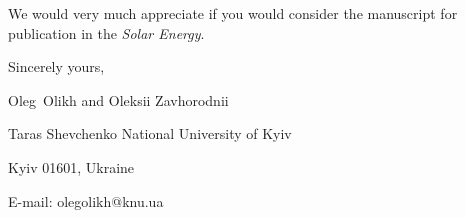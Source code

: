 \documentclass[preprint]{elsarticle}
\begin{document}
We would  very much appreciate if you would consider the manuscript for publication in the \emph{Solar Energy}.


\vspace{3mm}

Sincerely yours,

Oleg~Olikh and Oleksii Zavhorodnii


Taras Shevchenko National University of Kyiv


Kyiv 01601, Ukraine

E-mail: olegolikh@knu.ua


\end{document}

